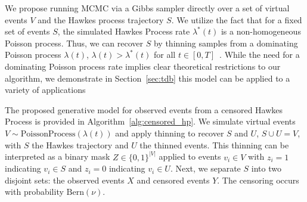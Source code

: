 \documentclass[11pt]{article}
\newcommand{\algrule}[1][.2pt]{\par\vskip.5\baselineskip\hrule height #1\par\vskip.5\baselineskip}
\begin{document}
We propose running MCMC via a Gibbs sampler directly over a set of virtual events $V$ and the Hawkes process trajectory $S$. We utilize the fact that for a fixed set of events $S$, the simulated Hawkes Process rate $\lambda^*(t)$ is a non-homogeneous Poisson process. Thus, we can recover $S$ by thinning samples from a dominating Poisson process $\lambda(t)$, $\lambda(t) > \lambda^*(t)$ for all $t \in [0,T]$~\cite{pthin}. While the need for a dominating Poisson process rate implies clear theoretical restrictions to our algorithm, we demonstrate in Section~\ref{sec:tdb} this model can be applied to a variety of applications

The proposed generative model for observed events from a censored Hawkes Process is provided in Algorithm~\ref{alg:censored_hp}. We simulate virtual events $V\sim \text{PoissonProcess}(\lambda(t))$ and apply thinning to recover $S$ and $U$, $S \cup U = V$, with $S$ the Hawkes trajectory and $U$ the thinned events. This thinning can be interpreted as a binary mask $Z \in \{0,1\}^{|V|}$ applied to events $v_i \in V$ with $z_i = 1$ indicating $v_i \in S$ and $z_i = 0$ indicating $v_i \in U$. Next, we separate $S$ into two disjoint sets: the observed events $X$ and censored events $Y$. The censoring occurs with probability $\text{Bern}(\nu)$. %

\end{document}
